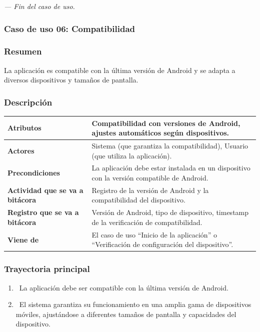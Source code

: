 \textit{--- Fin del caso de uso.}
\newpage
\subsubsection{Caso de uso 06: Compatibilidad}
\subsubsection{Resumen}
La aplicación es compatible con la última versión de Android y se adapta a diversos dispositivos y tamaños de pantalla.
\subsubsection{Descripción}
\begin{table}[h]
    \centering
    \begin{longtable}{|l|p{10cm}|}  %
    \hline
    \textbf{Atributos} & Compatibilidad con versiones de Android, ajustes automáticos según dispositivos. \\ \hline
    \textbf{Actores} & Sistema (que garantiza la compatibilidad), Usuario (que utiliza la aplicación). \\ \hline
    \textbf{Precondiciones} & La aplicación debe estar instalada en un dispositivo con la versión compatible de Android. \\ \hline
    \textbf{Actividad que se va a bitácora} & Registro de la versión de Android y la compatibilidad del dispositivo. \\ \hline
    \textbf{Registro que se va a bitácora} & Versión de Android, tipo de dispositivo, timestamp de la verificación de compatibilidad. \\ \hline
    \textbf{Viene de} & El caso de uso “Inicio de la aplicación” o “Verificación de configuración del dispositivo”. \\ \hline
       
    \end{longtable}
\end{table}
    
\subsubsection{Trayectoria principal}
\begin{enumerate}[label=\textbf{\arabic*}, leftmargin=1.5cm]
    \item \UCsystem \ La aplicación debe ser compatible con la última versión de Android.
    
    \item \UCsystem \ El sistema garantiza su funcionamiento en una amplia gama de dispositivos móviles, ajustándose a diferentes tamaños de pantalla y capacidades del dispositivo.

\end{enumerate}

